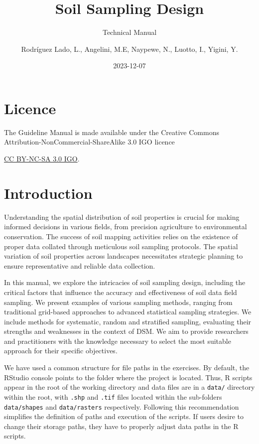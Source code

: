 \documentclass[
]{book}
\title{
Soil Sampling Design}
\subtitle{Technical Manual}
\author{Rodríguez Lado, L., Angelini, M.E, Naypewe, N., Luotto, I., Yigini, Y.}
\date{2023-12-07}
\begin{document}
\maketitle

{
\setcounter{tocdepth}{1}
\tableofcontents
}
\hypertarget{licence}{%
\chapter*{Licence}\label{licence}}

The Guideline Manual is made available under the Creative Commons Attribution-NonCommercial-ShareAlike 3.0 IGO licence

\href{https://creativecommons.org/licenses/by-nc-sa/3.0/igo/legalcode}{CC BY-NC-SA 3.0 IGO}.

\hypertarget{introduction}{%
\chapter{Introduction}\label{introduction}}

Understanding the spatial distribution of soil properties is crucial for making informed decisions in various fields, from precision agriculture to environmental conservation. The success of soil mapping activities relies on the existence of proper data collated through meticulous soil sampling protocols. The spatial variation of soil properties across landscapes necessitates strategic planning to ensure representative and reliable data collection.

In this manual, we explore the intricacies of soil sampling design, including the critical factors that influence the accuracy and effectiveness of soil data field sampling. We present examples of various sampling methods, ranging from traditional grid-based approaches to advanced statistical sampling strategies. We include methods for systematic, random and stratified sampling, evaluating their strengths and weaknesses in the context of DSM. We aim to provide researchers and practitioners with the knowledge necessary to select the most suitable approach for their specific objectives.

We have used a common structure for file paths in the exercises. By default, the RStudio console points to the folder where the project is located. Thus, R scripts appear in the root of the working directory and data files are in a \texttt{\textquotesingle{}data/\textquotesingle{}} directory within the root, with \texttt{\textquotesingle{}.shp\textquotesingle{}} and \texttt{\textquotesingle{}.tif\textquotesingle{}} files located within the sub-folders \texttt{\textquotesingle{}data/shapes\textquotesingle{}} and \texttt{\textquotesingle{}data/rasters\textquotesingle{}} respectively. Following this recommendation simplifies the definition of paths and execution of the scripts. If users desire to change their storage paths, they have to properly adjust data paths in the R scripts.
\end{document}
